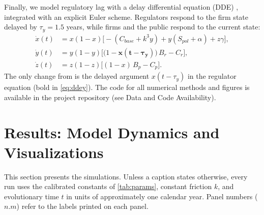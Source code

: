 \documentclass[10pt]{article}
\begin{document}
Finally, we model regulatory lag with a delay differential equation (DDE) \cite{kuang1993}, integrated with an explicit Euler scheme. Regulators respond to the firm state delayed by $\tau_y = 1.5$ years, while firms and the public respond to the current state:
\begin{align}
\dot{x}(t) &= x(1-x)\big[-(C_{base}+k^3 y) + y(S_{pol}+\alpha) + z\gamma\big], \label{eq:ddex}\\
\dot{y}(t) &= y(1-y)\big[\big(1-\boldsymbol{x(t-\tau_y)}\big)\,B_r - C_r\big], \label{eq:ddey}\\
\dot{z}(t) &= z(1-z)\big[(1-x)\,B_p - C_p\big]. \label{eq:ddez}
\end{align}
The only change from  is the delayed argument $x(t-\tau_y)$ in the regulator equation (bold in \cref{eq:ddey}). The code for all numerical methods and figures is available in the project repository (see Data and Code Availability).
\section{Results: Model Dynamics and Visualizations}\label{sec:results}
This section presents the simulations. Unless a caption states otherwise, every run uses the calibrated constants of \cref{tab:params}, constant friction $k$, and evolutionary time $t$ in units of approximately one calendar year. Panel numbers ($n.m$) refer to the labels printed on each panel.
\end{document}
